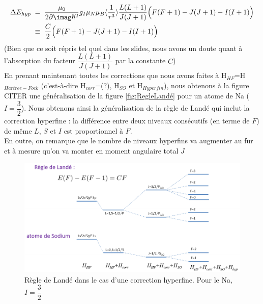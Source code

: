 \begin{align*}
    \Delta E_{hyp} &\eq  \dfrac{\mu_0}{2\p\imag\hbar^2}g_I\mu_N\mu_B\langle\dfrac{1}{r^3}\rangle\dfrac{L(L+1)}{J(J+1)}\Big( F(F+1) - J(J+1) - I(I+1) \Big)\\
    &\;\equiv\;
    \dfrac{C}{2} \Big( F(F+1) - J(J+1) - I(I+1) \Big)
\end{align*}
(Bien que ce soit répris tel quel dans les slides, nous avons un doute quant à l'absorption du facteur $\dfrac{L(L+1)}{J(J+1)}$ par la constante $C$)\\

En prenant maintenant toutes les corrections que nous avons faites à H$_{HF}$=H$_{Hartree-Fock}$ (c'est-à-dire H$_{corr}$=(?), H$_{SO}$ et H$_{Hyperfin}$), nous obtenons à la figure CITER une généralisation de la figure \ref{fig:RegleLandé} pour un atome de Na ($I=\dfrac{3}{2}$). Nous obtenons ainsi la généralisation de la règle de Landé qui inclut la correction hyperfine : la différence entre deux niveaux consécutifs (en terme de $F$) de même $L$, $S$ et $I$ est proportionnel à $F$.\\
En outre, on remarque que le nombre de niveaux hyperfins va augmenter au fur et à mesure qu'on va monter en moment angulaire total $J$
\begin{figure}[tph]
    \centering
    \includegraphics[scale=0.8]{Images2/règle_Landé2.png}
    \caption{Règle de Landé dans le cas d'une correction hyperfine. Pour le Na, $I=\dfrac{3}{2}$}
    \label{fig:règle_landé2}
\end{figure}

\vspace{1cm}

